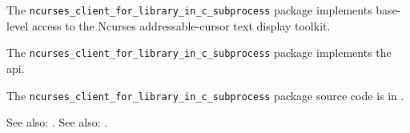 
The {\tt ncurses\_client\_for\_library\_in\_c\_subprocess} package implements base-level access to the Ncurses addressable-cursor 
text display toolkit.

The {\tt ncurses\_client\_for\_library\_in\_c\_subprocess} package implements the  api.

The {\tt ncurses\_client\_for\_library\_in\_c\_subprocess} package source code is in .

See also:  .
See also:  .


